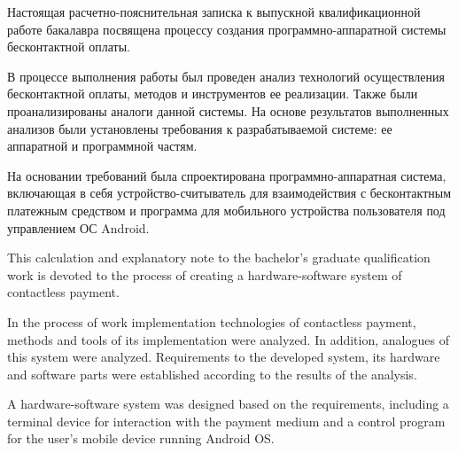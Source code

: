 \newpage


Настоящая расчетно-пояснительная записка к выпускной квалификационной работе бакалавра посвящена процессу создания программно-аппаратной системы бесконтактной оплаты.

В процессе выполнения работы был проведен анализ технологий осуществления бесконтактной оплаты, методов и инструментов ее реализации. 
Также были проанализированы аналоги данной системы.
На основе результатов выполненных анализов были установлены требования к разрабатываемой системе: ее аппаратной и программной частям.

На основании требований была спроектирована программно-аппаратная система, включающая в себя устройство-считыватель для взаимодействия с бесконтактным платежным средством и программа для мобильного устройства пользователя под управлением ОС Android.


\vspace{0.5\baselineskip}


This calculation and explanatory note to the bachelor's graduate qualification work is devoted to the process of creating a hardware-software system of contactless payment.

In the process of work implementation technologies of contactless payment, methods and tools of its implementation were analyzed. 
In addition, analogues of this system were analyzed.
Requirements to the developed system, its hardware and software parts were established according to the results of the analysis.

A hardware-software system was designed based on the requirements, including a terminal device for interaction with the payment medium and a control program for the user's mobile device running Android OS.